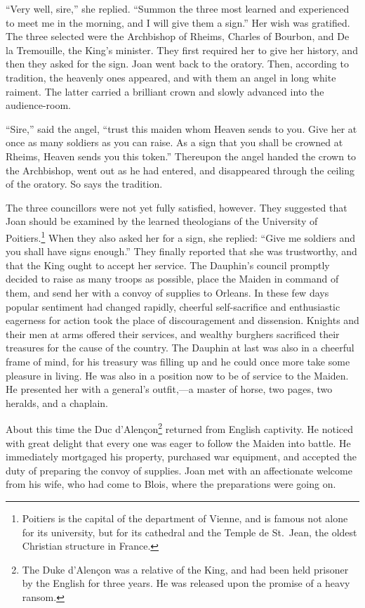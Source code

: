 ``Very well, sire,'' she replied. ``Summon the three most learned and
experienced to meet me in the morning, and I will give them a sign.''
Her wish was gratified. The three selected were the Archbishop of
Rheims, Charles of Bourbon, and De la Tremouille, the King's minister.
They first required her to give her history, and then they asked for the
sign. Joan went back to the oratory. Then, according to tradition, the
heavenly ones appeared, and with them an angel in long white raiment.
The latter carried a brilliant crown and slowly advanced into the
audience-room.

``Sire,'' said the angel, ``trust this maiden whom Heaven sends to you.
Give her at once as many soldiers as you can raise. As a sign that you
shall be crowned at Rheims, Heaven sends you this token.'' Thereupon the
angel handed the crown to the Archbishop, went out as he had entered,
and disappeared through the ceiling of the oratory. So says the
tradition.

The three councillors were not yet fully satisfied, however. They
suggested that Joan should be examined by the learned theologians of the
University of Poitiers.\footnote{Poitiers is the capital of the
  department of Vienne, and is famous not alone for its university, but
  for its cathedral and the Temple de St.~Jean, the oldest Christian
  structure in France.} When they also asked her for a sign, she
replied: ``Give me soldiers and you shall have signs enough.'' They
finally reported that she was trustworthy, and that the King ought to
accept her service. The Dauphin's council promptly decided to raise as
many troops as possible, place the Maiden in command of them, and send
her with a convoy of supplies to Orleans. In these few days popular
sentiment had changed rapidly, cheerful self-sacrifice and enthusiastic
eagerness for action took the place of discouragement and dissension.
Knights and their men at arms offered their services, and wealthy
burghers sacrificed their treasures for the cause of the country. The
Dauphin at last was also in a cheerful frame of mind, for his treasury
was filling up and he could once more take some pleasure in living. He
was also in a position now to be of service to the Maiden. He presented
her with a general's outfit,---a master of horse, two pages, two
heralds, and a chaplain.

About this time the Duc d'Alençon\footnote{The Duke d'Alençon was a
  relative of the King, and had been held prisoner by the English for
  three years. He was released upon the promise of a heavy ransom.}
returned from English captivity. He noticed with great delight that
every one was eager to follow the Maiden into battle. He immediately
mortgaged his property, purchased war equipment, and accepted the duty
of preparing the convoy of supplies. Joan met with an affectionate
welcome from his wife, who had come to Blois, where the preparations
were going on.

